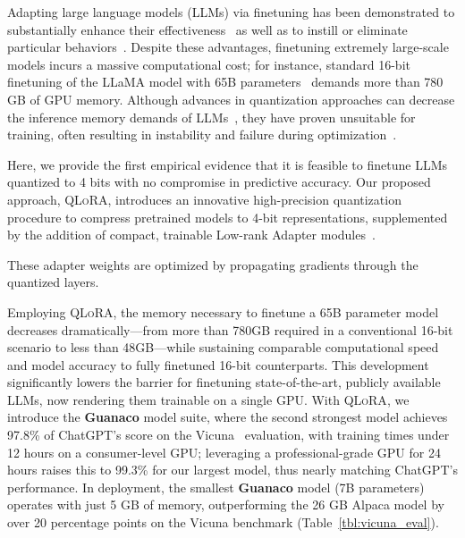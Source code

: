 Adapting large language models (LLMs) via finetuning has been demonstrated to substantially enhance their effectiveness~\citep{min2021metaicl, wei2021finetuned, ouyang2022training, wang2022super, wang2022self, liu2022few} as well as to instill or eliminate particular behaviors~\citep{ouyang2022training,askell2021general,bai2022training}. Despite these advantages, finetuning extremely large-scale models incurs a massive computational cost; for instance, standard 16-bit finetuning of the LLaMA model with 65B parameters~\citep{touvron2023llama} demands more than 780 GB of GPU memory. Although advances in quantization approaches can decrease the inference memory demands of LLMs~\citep{dettmers2022llm, dettmers2022case, frantar2022gptq, xiao2022smoothquant}, they have proven unsuitable for training, often resulting in instability and failure during optimization~\citep{wortsman2023stable}.

Here, we provide the first empirical evidence that it is feasible to finetune LLMs quantized to 4 bits with no compromise in predictive accuracy. Our proposed approach, \textsc{QLoRA}, introduces an innovative high-precision quantization procedure to compress pretrained models to 4-bit representations, supplemented by the addition of compact, trainable Low-rank Adapter modules~\citep{hu2021lora}.

These adapter weights are optimized by propagating gradients through the quantized layers.

Employing \textsc{QLoRA}, the memory necessary to finetune a 65B parameter model decreases dramatically—from more than 780GB required in a conventional 16-bit scenario to less than 48GB—while sustaining comparable computational speed and model accuracy to fully finetuned 16-bit counterparts. This development significantly lowers the barrier for finetuning state-of-the-art, publicly available LLMs, now rendering them trainable on a single GPU. With \textsc{QLoRA}, we introduce the \textbf{Guanaco} model suite, where the second strongest model achieves 97.8\% of ChatGPT’s score on the Vicuna~\citep{vicuna2023} evaluation, with training times under 12 hours on a consumer-level GPU; leveraging a professional-grade GPU for 24 hours raises this to 99.3\% for our largest model, thus nearly matching ChatGPT's performance. In deployment, the smallest \textbf{Guanaco} model (7B parameters) operates with just 5 GB of memory, outperforming the 26 GB Alpaca model by over 20 percentage points on the Vicuna benchmark (Table~\ref{tbl:vicuna_eval}).

